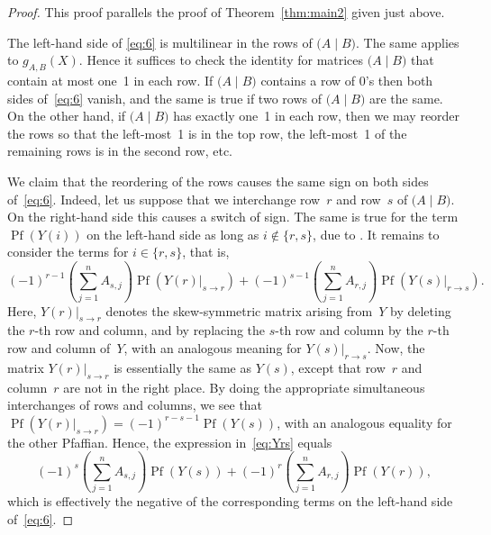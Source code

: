 \documentclass[12pt,reqno]{amsart}
\numberwithin{equation}{section}
\theoremstyle{definition}
\theoremstyle{remark}
\def\Pf{\operatorname{Pf}}
\begin{document}
\begin{proof}
This proof parallels the proof of Theorem~\ref{thm:main2} given just
above.

The left-hand side of \eqref{eq:6} 
is multilinear in the rows of $\bigl(A\mid B\bigr)$.
The same applies to $g_{A,B}(X)$. Hence it suffices to check
the identity for matrices $\bigl(A\mid B\bigr)$ that contain at
most one~1 in each row. If $\bigl(A\mid B\bigr)$ contains a row of 0's then
both sides of~\eqref{eq:6} vanish, and the same is true if two
rows of $\bigl(A\mid B\bigr)$ are the same.
On the other hand, if $\bigl(A\mid B\bigr)$
has exactly one~1 in each row, then we may reorder the rows so that
the left-most~1 is in the top row, the left-most~1 of the remaining
rows is in the second row, etc.

We claim that
the reordering of the rows causes
the same sign on both sides of~\eqref{eq:6}.
Indeed, let us suppose that we interchange row~$r$ and row~$s$
of $\bigl(A\mid B\bigr)$. On the right-hand side this causes a
switch of sign. The same is true for the term $\Pf(Y(i))$ on the
left-hand side as long as $i\notin\{r,s\}$, due to 
\cite[Prop.~2.3(b)]{StemAE}. It remains to consider the terms
for $i\in\{r,s\}$, that is,
\begin{equation} \label{eq:Yrs} 
(-1)^{r-1}\left(\sum_{j=1}^nA_{s,j}\right)\Pf
\left(Y(r)\big\vert_{s\to r}\right)
+(-1)^{s-1}\left(\sum_{j=1}^nA_{r,j}\right)\Pf
\left(Y(s)\big\vert_{r\to s}\right).
\end{equation}
Here, $Y(r)\big\vert_{s\to r}$ denotes the skew-symmetric matrix
arising from~$Y$ by deleting the $r$-th row and column, and by
replacing the $s$-th row and column by the $r$-th row and column
of~$Y$, with an analogous meaning for $Y(s)\big\vert_{r\to s}$. 
Now, the matrix $Y(r)\big\vert_{s\to r}$ is essentially the same as
$Y(s)$, except that row~$r$ and column~$r$ are not in the right place.
By doing the appropriate simultaneous interchanges of rows and
columns, we see that
$\Pf\left(Y(r)\big\vert_{s\to r}\right)=(-1)^{r-s-1}\Pf(Y(s))$,
with an analogous equality for the other Pfaffian. Hence, the
expression in~\eqref{eq:Yrs} equals
$$
(-1)^{s}\left(\sum_{j=1}^nA_{s,j}\right)\Pf(Y(s))
+(-1)^{r}\left(\sum_{j=1}^nA_{r,j}\right)\Pf(Y(r)),
$$
which is effectively the negative of the corresponding terms on the
left-hand side of~\eqref{eq:6}.


\end{proof}
\end{document}
